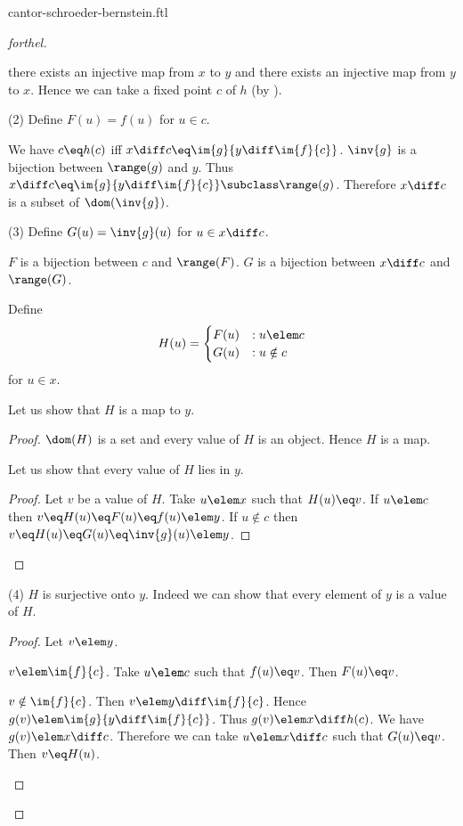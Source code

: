\documentclass{article}
\begin{document}
\begin{smodule}{cantor-schroeder-bernstein.ftl}
\begin{proof}[forthel]
\begin{case}{there exists an injective map from $x$ to $y$ and there exists an injective map from $y$ to $x$.}
    Hence we can take a fixed point $c$ of $h$ (by ).

    (2) Define $F(u) = f(u)$ for $u \in c$.

    We have $c \eq h(c)$ iff $x \diff c \eq \im{g}{y \diff \im{f}{c}}$.
    $\inv{g}$ is a bijection between $\range(g)$ and $y$.
    Thus $x \diff c \eq \im{g}{y \diff \im{f}{c}} \subclass \range(g)$.
    Therefore $x \diff c$ is a subset of $\dom(\inv{g})$. %

    (3) Define $G(u) = \inv{g}(u)$ for $u \in x \diff c$.

    $F$ is a bijection between $c$ and $\range(F)$.
    $G$ is a bijection between $x \diff c$ and $\range(G)$.

    Define \[ H(u) =
      \begin{cases}
        F(u) & : u \elem c \\
        G(u) & : u \notin c
      \end{cases} \]
    for $u \in x$.

    Let us show that $H$ is a map to $y$.
    \begin{proof}
      $\dom(H)$ is a set and every value of $H$ is an object.
      Hence $H$ is a map.

      Let us show that every value of $H$ lies in $y$.
      \begin{proof}
        Let $v$ be a value of $H$.
        Take $u \elem x$ such that $H(u) \eq v$.
        If $u \elem c$ then $v \eq H(u) \eq F(u) \eq f(u) \elem y$.
        If $u \notin c$ then $v \eq H(u) \eq G(u) \eq \inv{g}(u) \elem y$.
      \end{proof}
    \end{proof}

    (4) $H$ is surjective onto $y$.
    Indeed we can show that every element of $y$ is a value of $H$.
    \begin{proof}
      Let $v \elem y$.

      \begin{case}{$v \elem \im{f}{c}$.}
        Take $u \elem c$ such that $f(u) \eq v$.
        Then $F(u) \eq v$.
      \end{case}

      \begin{case}{$v \notin \im{f}{c}$.}
        Then $v \elem y \diff \im{f}{c}$.
        Hence $g(v) \elem \im{g}{y \diff \im{f}{c}}$.
        Thus $g(v) \elem x \diff h(c)$.
        We have $g(v) \elem x \diff c$.
        Therefore we can take $u \elem x \diff c$ such that $G(u) \eq v$.
        Then $v \eq H(u)$.
      \end{case}
    \end{proof}


\end{case}
\end{proof}
\end{smodule}
\end{document}
